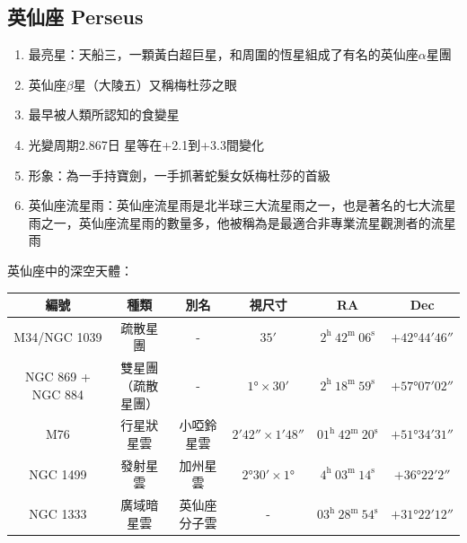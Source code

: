 \subsection{英仙座 Perseus}
\begin{enumerate}
    \item 最亮星：天船三，一顆黃白超巨星，和周圍的恆星組成了有名的英仙座\(\alpha\)星團
    \item 英仙座\(\beta\)星（大陵五）又稱梅杜莎之眼
    \item 最早被人類所認知的食變星
    \item 光變周期2.867日 星等在+2.1到+3.3間變化
    \item 形象：為一手持寶劍，一手抓著蛇髮女妖梅杜莎的首級
    \item 英仙座流星雨：英仙座流星雨是北半球三大流星雨之一，也是著名的七大流星雨之一，英仙座流星雨的數量多，他被稱為是最適合非專業流星觀測者的流星雨
\end{enumerate}
英仙座中的深空天體：
\newline

\begin{center}
\begin{longtable}{c | c | c | c | c | c}
    編號 & 種類 & 別名 & 視尺寸 & RA & Dec \\
    \hline
    \endfirsthead


    \endfoot

    \endlastfoot

    M34/NGC 1039 & 疏散星團 & - & \(\ang{;35;}\) & \(2^\text{h }42^\text{m }06^\text{s}\) & \(+\ang{42;44;46}\) \\ %
    NGC 869 + NGC 884 & \makecell{雙星團\\（疏散星團）} & - & \(\ang{1;;}\times\ang{;30;}\) & \(2^\text{h }18^\text{m }59^\text{s}\) & \(+\ang{57;07;02}\) \\ %
    M76 & 行星狀星雲 & 小啞鈴星雲 & \(\ang{;2;42}\times\ang{;1;48}\) & \(01^\text{h }42^\text{m }20^\text{s}\) & \(+\ang{51;34;31}\) \\ %
    NGC 1499 & 發射星雲 & 加州星雲 & \(\ang{2;30}\times\ang{1;;}\) & \(4^\text{h }03^\text{m }14^\text{s}\) & \(+\ang{36;22;2}\) \\ %
    NGC 1333 & 廣域暗星雲 & 英仙座分子雲 & - & \(03^\text{h }28^\text{m }54^\text{s}\) & \(+\ang{31;22;12}\) \\ %
\end{longtable}
\end{center}

